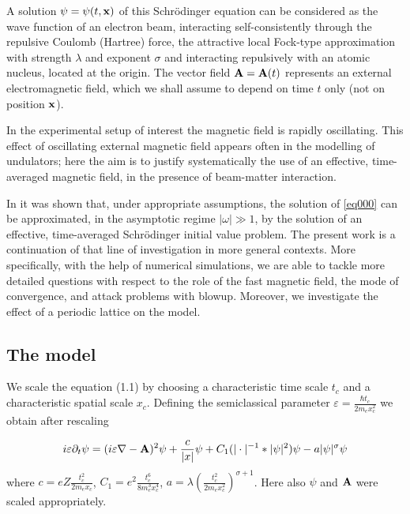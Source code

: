 \documentclass[10pt, leqno]{amsart}
\newcommand{\xb}{\boldsymbol{\rm{x}}}
\newcommand{\Ab}{\boldsymbol{\rm{A}}}
\def\d{{\partial}}
\newcommand{\eps}{\varepsilon}
\begin{document}
A solution $\psi=\psi(t, \xb)$  of this Schr\"odinger equation can be considered as the
wave function of an electron beam, interacting self-consistently through the repulsive
Coulomb (Hartree) force, the attractive local Fock-type approximation with strength
$\lambda$ and exponent $\sigma$ and interacting repulsively with an atomic nucleus,
located at the origin. The vector field ${\Ab}={\Ab}(t)$ represents an external
electromagnetic field, which we shall assume to depend on time $t$ only (not on position
$\xb$).

In the experimental setup of interest \cite{Ch,frat1} the magnetic field is rapidly
oscillating. This effect of oscillating external magnetic field appears often in the
modelling of undulators; here the aim is to justify systematically the use of an
effective, time-averaged magnetic field, in the presence of beam-matter interaction.

 In \cite{xfel1} it was shown that, under appropriate assumptions, the  solution of
 \eqref{eq000} can be approximated, in the asymptotic regime $|\omega| \gg 1$, by the
 solution of an effective, time-averaged Schr\"odinger initial value problem. The present
 work is a continuation of that line of investigation in more general contexts. More
 specifically, with the help of numerical simulations, we are able to tackle more detailed
 questions with respect to the role of the fast magnetic field, the mode of convergence,
 and attack problems with blowup. Moreover, we investigate the effect of a periodic
 lattice on the model.


\subsection{The model}

We scale the equation (1.1) by choosing a characteristic time scale $t_c$ and a characteristic spatial scale $x_c$. Defining the semiclassical parameter $\eps=\frac{\hbar t_c}{2m_ex_c^2}$ we obtain after rescaling

\begin{equation*}
i\eps\d_t\psi=(i\eps\nabla-\Ab)^2\psi+\frac{c}{|x|}\psi+C_1(|\cdot|^{-1}\ast|\psi|^2)\psi-a|\psi|^\sigma\psi
\end{equation*}
where $c=eZ\frac{t_c^2}{2m_ex_c}$, $C_1=e^2\frac{t_c^6}{8m_e^3x_c^4}$,
$a=\lambda\left(\frac{t_c^2}{2m_ex_c^2}\right)^{\sigma+1}$.
Here also $\psi$ and $\Ab$ were scaled appropriately.
\end{document}
